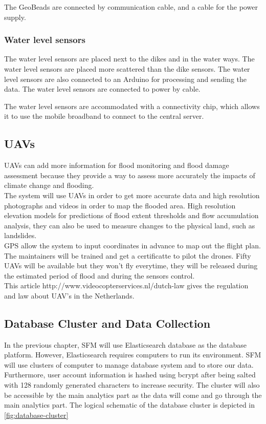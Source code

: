 The GeoBeads are connected by communication cable, and a cable for the power supply. 

\subsubsection*{Water level sensors}
The water level sensors are placed next to the dikes and in the water ways. The water level sensors are placed more scattered than the dike sensors. The water level sensors are also connected to an Arduino for processing and sending the data. The water level sensors are connected to power by cable.

The water level sensors are accommodated with a connectivity chip, which allows it to use the mobile broadband to connect to the central server.

\subsection{UAVs}
UAVs can add more information for flood monitoring and flood damage assessment because they provide a way to assess more accurately the impacts of climate change and flooding.\\
The system will use UAVs in order to get more accurate data and high resolution photographs and videos in order to map the flooded area.
High resolution elevation models for predictions of flood extent thresholds and flow accumulation analysis, they can also be used to measure changes to the physical land, such as landslides. \\
GPS allow the system to input coordinates in advance to map out the flight plan. \\
The maintainers will be trained and get a certificatte to pilot the drones.
Fifty UAVs will be available but they won't fly everytime, they will be released during the estimated period of flood and during the sensors control. \\

This article http://www.videocopterservices.nl/dutch-law gives the regulation and law about UAV's in the Netherlands.\\

\clearpage
\subsection{Database Cluster and Data Collection}
\label{subsec:database-data}
In the previous chapter, SFM will use Elasticsearch database as the database platform. However, Elasticsearch requires computers to run its environment. SFM will use clusters of computer to manage database system and to store our data. Furthermore, user account information is hashed using bcrypt after being salted with 128 randomly generated characters to increase security. The cluster will also be accessible by the main analytics part as the data will come and go through the main analytics part. The logical schematic of the database cluster is depicted in \autoref{fig:database-cluster}

